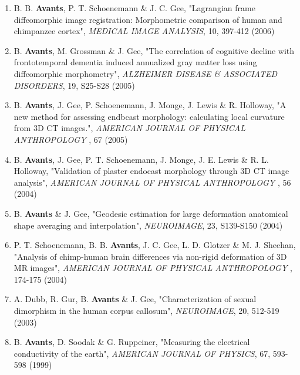 \documentclass[11pt]{moderncv} %
\begin{document}
\begin{enumerate}
\item B. B. \textbf{Avants}, P. T. Schoenemann \&  J. C. Gee, 
"Lagrangian frame diffeomorphic image registration: Morphometric comparison of human and chimpanzee cortex", 
{\em MEDICAL IMAGE ANALYSIS}, 10, 397-412 (2006)
\item B. \textbf{Avants}, M. Grossman \&  J. Gee, 
"The correlation of cognitive decline with frontotemporal dementia induced annualized gray matter loss using diffeomorphic morphometry", 
{\em ALZHEIMER DISEASE \&  ASSOCIATED DISORDERS}, 19, S25-S28 (2005)
\item B. \textbf{Avants}, J. Gee, P. Schoenemann, J. Monge, J. Lewis \&  R. Holloway, 
"A new method for assessing endbcast morphology: calculating local curvature from 3D CT images.", 
{\em AMERICAN JOURNAL OF PHYSICAL ANTHROPOLOGY}
,
67 (2005)
\item B. \textbf{Avants}, J. Gee, P. T. Schoenemann, J. Monge, J. E. Lewis \&  R. L. Holloway, 
"Validation of plaster endocast morphology through 3D CT image analysis", 
{\em AMERICAN JOURNAL OF PHYSICAL ANTHROPOLOGY}
,
56 (2004)
\item B. \textbf{Avants} \&  J. Gee, 
"Geodesic estimation for large deformation anatomical shape averaging and interpolation", 
{\em NEUROIMAGE}, 23, S139-S150 (2004)
\item P. T. Schoenemann, B. B. \textbf{Avants}, J. C. Gee, L. D. Glotzer \&  M. J. Sheehan, 
"Analysis of chimp-human brain differences via non-rigid deformation of 3D MR images", 
{\em AMERICAN JOURNAL OF PHYSICAL ANTHROPOLOGY}
,
174-175 (2004)
\item A. Dubb, R. Gur, B. \textbf{Avants} \&  J. Gee, 
"Characterization of sexual dimorphism in the human corpus callosum", 
{\em NEUROIMAGE}, 20, 512-519 (2003)
\item B. \textbf{Avants}, D. Soodak \&  G. Ruppeiner, 
"Measuring the electrical conductivity of the earth", 
{\em AMERICAN JOURNAL OF PHYSICS}, 67, 593-598 (1999)
\end{enumerate}
\end{document}
